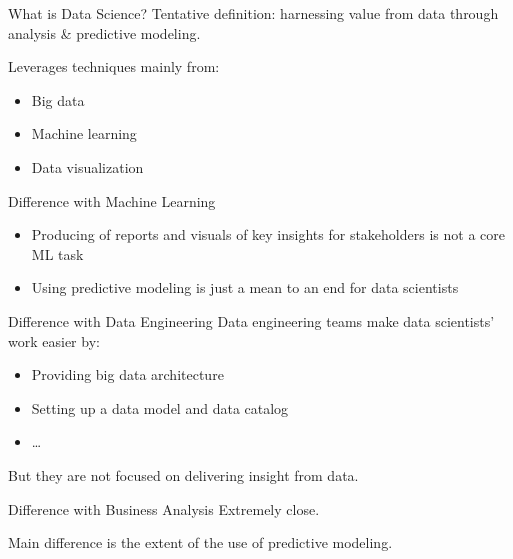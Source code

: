 \begin{frame}{What is Data Science?}
  Tentative definition: harnessing value from data through analysis \& predictive modeling.

  Leverages techniques mainly from:

  \begin{itemize}
    \item Big data
    \item Machine learning
    \item Data visualization
  \end{itemize}
\end{frame}

\begin{frame}{Difference with Machine Learning}
  \begin{itemize}
    \item Producing of reports and visuals of key insights for stakeholders is not a core ML task
    \item Using predictive modeling is just a mean to an end for data scientists
  \end{itemize}
\end{frame}

\begin{frame}{Difference with Data Engineering}
  Data engineering teams make data scientists' work easier by:

  \begin{itemize}
    \item Providing big data architecture
    \item Setting up a data model and data catalog
    \item …
  \end{itemize}

  But they are not focused on delivering insight from data.
\end{frame}

\begin{frame}{Difference with Business Analysis}
  Extremely close.

  Main difference is the extent of the use of predictive modeling.
\end{frame}
